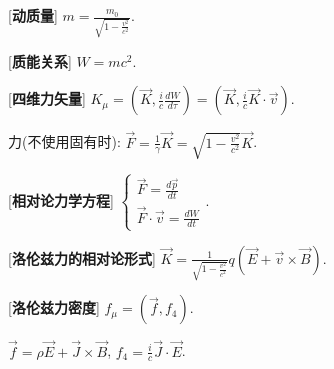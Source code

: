 [\textbf{动质量}] $m=\frac{m_0}{\sqrt{1-\frac{v^2}{c^2}}}$.\par

[\textbf{质能关系}] $W=mc^2$.\par

[\textbf{四维力矢量}] $K_\mu=(\vec K, \frac{i}{c}\frac{dW}{d\tau})=(\vec K,\frac{i}{c}\vec K\cdot\vec v)$.\par
\qquad 力(不使用固有时): $\vec F=\frac{1}{\gamma}\vec K=\sqrt{1-\frac{v^2}{c^2}}\vec K$.\par

[\textbf{相对论力学方程}] $\begin{cases}\vec F=\frac{d\vec p}{dt}\\\vec F\cdot\vec v=\frac{dW}{dt}\end{cases}$.\par

[\textbf{洛伦兹力的相对论形式}] $\vec K=\frac{1}{\sqrt{1-\frac{v^2}{c^2}}}q(\vec E+\vec v\times\vec B)$.\par

[\textbf{洛伦兹力密度}] $f_\mu=(\vec f,f_4)$.\par
\qquad $\vec f=\rho\vec E+\vec J\times\vec B$, $f_4=\frac{i}{c}\vec J\cdot\vec E$.\par



